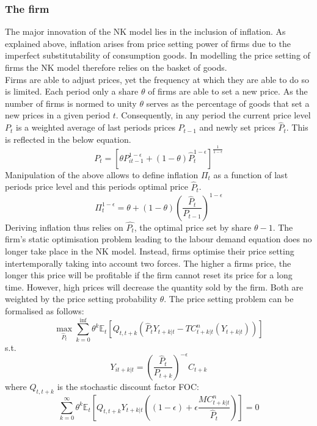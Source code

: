 \documentclass[12pt,a4paper,english]{article} %
\newcommand{\E}{\mathbb{E}} %
\begin{document}
	\subsubsection{The firm}
	The major innovation of the NK model lies in the inclusion of inflation. As explained above, inflation arises from price setting power of firms due to the imperfect substitutability of consumption goods. In modelling the price setting of firms the NK model therefore relies on the basket of goods. \\
	Firms are able to adjust prices, yet the frequency at which they are able to do so is limited. Each period only a share $\theta$ of firms are able to set a new price. As the number of firms is normed to unity $\theta$ serves as the percentage of goods that set a new prices in a given period $t$. Consequently, in any period the current price level $P_t$ is a weighted average of last periods prices $P_{t-1}$ and newly set prices $\hat{P}_t$. This is reflected in the below equation.
	\[
		P_t = \left[ 
					\theta P_{it-1}^{1 - \epsilon} + (1 - \theta) \hat{P}_t^{1 - \epsilon}
			\right]^{\frac{1}{1 - \epsilon}}
	\]
	Manipulation of the above allows to define inflation $\Pi_t$ as a function of last periods price level and this periods optimal price $\hat{P}_t$.
	\begin{equation} \label{eq: 2}
		\Pi_t^{1-\epsilon} = \theta + (1 - \theta) \left(\frac{\hat{P}_t}{P_{t-1}} \right)^{1-\epsilon}
	\end{equation}
	Deriving inflation thus relies on $\hat{P_t}$, the optimal price set by share $\theta-1$. The firm's static optimisation problem leading to the labour demand equation does no longer take place in the NK model. Instead, firms optimise their price setting intertemporally taking into account two forces. The higher a firms price, the longer this price will be profitable if the firm cannot reset its price for a long time. However, high prices will decrease the quantity sold by the firm. Both are weighted by the price setting probability $\theta$. The price setting problem can be formalised as follows: 
	\[
		\max_{\hat{P}_t} 
		 \sum_{k=0}^{\inf} \theta^k \E_t 
			\left[
				Q_{t, t+k} 
					\left(
						\hat{P}_t Y_{t+k|t} - TC_{t+k|t}^n(Y_{t+k|t})
					\right)
			\right]
	\]
	s.t.
	\[
		Y_{it+k|t} = \left(\frac{\hat{P}_t}{P_{t+k}} \right)^{-\epsilon} C_{t+k}
	\]
	where $Q_{t, t+k}$ is the stochastic discount factor
	FOC:
	\[
		\sum_{k=0}^{\infty} \theta^k \E_t 
		\left[
			Q_{t,t+k} Y_{t+k|t} 
			\left(
				(1 - \epsilon) + \epsilon \frac{MC_{t+k|t}^n}{\hat{P}_t}
			\right)
		\right]
		= 0
	\]
\end{document}
